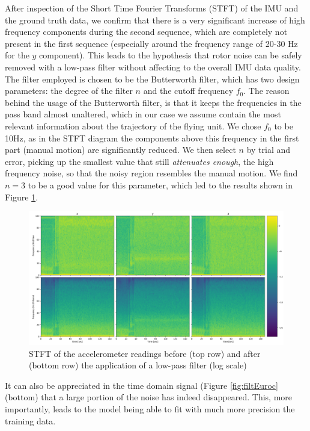 After inspection of the Short Time Fourier Transforms (STFT) of the IMU and the ground truth data, we confirm that there is a very significant increase of high frequency components during the second sequence, which are completely not present in the first sequence (especially around the frequency range of 20-30 Hz for the $y$ component).
This leads to the hypothesis that rotor noise can be safely removed with a low-pass filter without affecting to the overall IMU data quality.
The filter employed is chosen to be the Butterworth filter, which has two design parameters: the degree of the filter $n$ and the cutoff frequency $f_0$. 
The reason behind the usage of the Butterworth filter, is that it keeps the frequencies in the pass band almost unaltered, which in our case we assume contain the most relevant information about the trajectory of the flying unit.
We chose $f_0$ to be 10Hz, as in the STFT diagram the components above this frequency in the first part (manual motion) are significantly reduced.
We then select $n$ by trial and error, picking up the smallest value that still \emph{attenuates enough}, the high frequency noise, so that the noisy region resembles the manual motion. 
We find $n=3$ to be a good value for this parameter, which led to the results shown in Figure \ref{fig:accSTFT}.
\begin{figure}
    \centering
    \includegraphics[width=\textwidth,height=\textheight,keepaspectratio]{thesis_template/img/accSTFT.png} 
    \caption{STFT of the accelerometer readings before (top row) and after (bottom row) the application of a low-pass filter (log scale)}
    \label{fig:accSTFT}
\end{figure}
It can also be appreciated in the time domain signal (Figure \ref{fig:filtEuroc} (bottom) that a large portion of the noise has indeed disappeared.
This, more importantly, leads to the model being able to fit with much more precision the training data.
